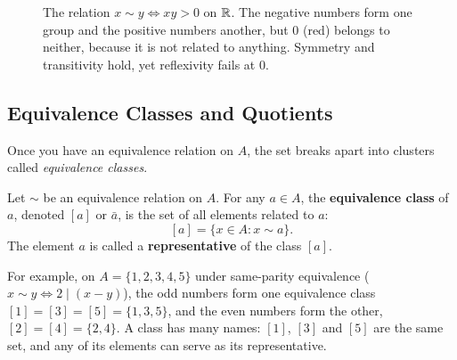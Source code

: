 \begin{figure}[htbp]
\centering
{}
\caption{The relation $x \sim y \iff xy > 0$ on $\mathbb{R}$. The negative numbers form one group and the positive numbers another, but $0$ (red) belongs to neither, because it is not related to anything. Symmetry and transitivity hold, yet reflexivity fails at $0$.}
\label{15:fig-sign-relation}
\end{figure}

\subsection{Equivalence Classes and Quotients}

Once you have an equivalence relation on $A$, the set breaks apart into clusters called \emph{equivalence classes}.

\begin{definition}
Let $\sim$ be an equivalence relation on $A$. For any $a \in A$, the \textbf{equivalence class} of $a$, denoted $[a]$ or $\bar{a}$, is the set of all elements related to $a$:
\[
[a] = \{x \in A : x \sim a\}.
\]
The element $a$ is called a \textbf{representative} of the class $[a]$.
\end{definition}

For example, on $A = \{1, 2, 3, 4, 5\}$ under same-parity equivalence ($x \sim y \iff 2 \mid (x - y)$), the odd numbers form one equivalence class $[1] = [3] = [5] = \{1, 3, 5\}$, and the even numbers form the other, $[2] = [4] = \{2, 4\}$. A class has many names: $[1]$, $[3]$ and $[5]$ are the same set, and any of its elements can serve as its representative.

